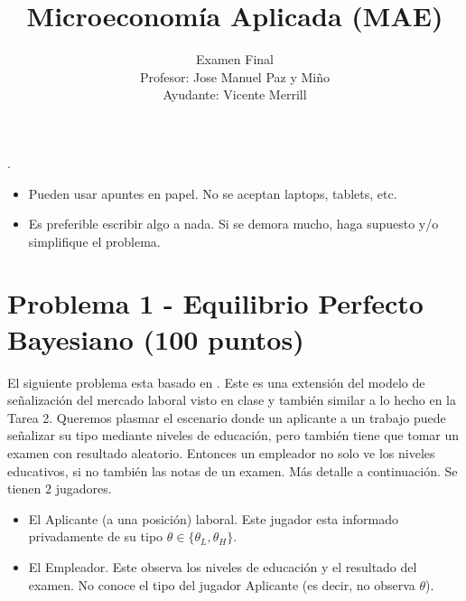 \documentclass[11pt]{article}
\title{Microeconom\'ia Aplicada (MAE)}
\author{Examen Final \\ Profesor: Jose Manuel Paz y Mi\~no \\ Ayudante: Vicente Merrill}
\date{}
\newcommand{\blankline}{\quad\pagebreak[2]}
\begin{document}
\maketitle

\blankline

\setlength{\parindent}{0pt}.

\begin{itemize}
	\item Pueden usar apuntes en papel. No se aceptan laptops, tablets, etc.
	\item Es preferible escribir algo a nada. Si se demora mucho, haga supuesto y/o simplifique el problema.
\end{itemize}

\section*{Problema 1 - Equilibrio Perfecto Bayesiano (100 puntos)}

El siguiente problema esta basado en \cite{daley2014market}. Este es una extensi\'on del modelo de se\~nalizaci\'on del mercado laboral visto en clase y tambi\'en similar a lo hecho en la Tarea 2. Queremos plasmar el escenario donde un aplicante a un trabajo puede se\~nalizar su tipo mediante niveles de educaci\'on, pero tambi\'en tiene que tomar un examen con resultado aleatorio. Entonces un empleador no solo ve los niveles educativos, si no tambi\'en las notas de un examen. M\'as detalle a continuaci\'on. Se tienen $2$ jugadores.
\begin{itemize}
	\item El Aplicante (a una posici\'on) laboral. Este jugador esta informado privadamente de su tipo $\theta \in\{ \theta_{L}, \theta_{H} \}$. 
	\item El Empleador. Este observa los niveles de educaci\'on y el resultado del examen. No conoce el tipo del jugador Aplicante (es decir, no observa $\theta$).
\end{itemize}
\end{document}
